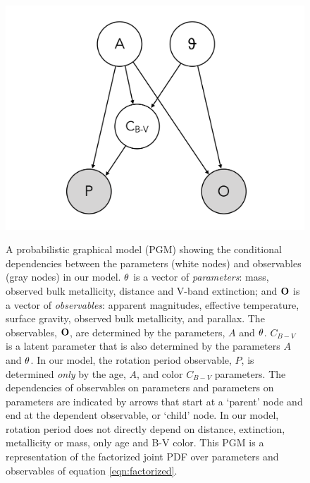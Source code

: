 \begin{figure}
  \caption{
A probabilistic graphical model (PGM) showing the conditional
dependencies between the parameters (white nodes) and
observables (gray nodes) in our model.
${\bf \theta}$ is a vector of {\it parameters}: mass, observed bulk
    metallicity, distance and V-band extinction; and ${\bf O}$ is a vector of
    {\it observables}: apparent magnitudes, effective temperature, surface
    gravity, observed bulk metallicity, and parallax.
    The observables, ${\bf O}$, are determined by the parameters, $A$ and
    ${\bf \theta}$.
    $C_{B-V}$ is a latent parameter that is also determined by the parameters
    $A$ and ${\bf \theta}$.
    In our model, the rotation period observable, $P$, is determined {\it
    only} by the age, $A$, and color ${C_{B-V}}$ parameters.
The dependencies of observables on parameters and parameters on parameters are
    indicated by arrows that start at a `parent' node and end at the dependent
    observable, or `child' node.
In our model, rotation period does not directly depend on distance,
extinction, metallicity or mass, only age and B-V color.
This PGM is a representation of the factorized joint PDF over parameters and
observables of equation \ref{eqn:factorized}.
}
  \centering
    \includegraphics[width=.7\textwidth]{PGM}
\label{fig:PGM}
\end{figure}
